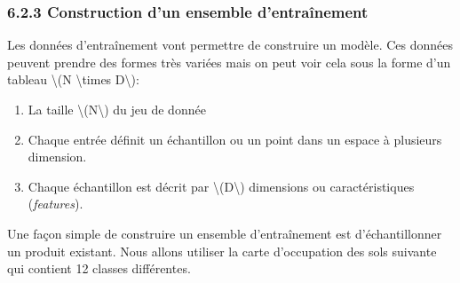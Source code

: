 \documentclass[
]{article}
\begin{document}
\label{sec-05.02.02}
\subsubsection{\texorpdfstring{{6.2.3} Construction d'un ensemble
d'entraînement}{6.2.3 Construction d'un ensemble d'entraînement}}\label{construction-dun-ensemble-dentrauxeenement}

Les données d'entraînement vont permettre de construire un modèle. Ces
données peuvent prendre des formes très variées mais on peut voir cela
sous la forme d'un tableau {\textbackslash(N \textbackslash times
D\textbackslash)}:

\begin{enumerate}
\def\labelenumi{\arabic{enumi}.}
\item
  La taille {\textbackslash(N\textbackslash)} du jeu de donnée
\item
  Chaque entrée définit un échantillon ou un point dans un espace à
  plusieurs dimension.
\item
  Chaque échantillon est décrit par {\textbackslash(D\textbackslash)}
  dimensions ou caractéristiques (\emph{features}).
\end{enumerate}

Une façon simple de construire un ensemble d'entraînement est
d'échantillonner un produit existant. Nous allons utiliser la carte
d'occupation des sols suivante qui contient 12 classes différentes.
\end{document}
